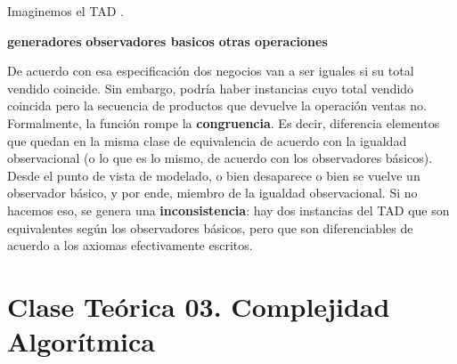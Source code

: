 \documentclass[10pt,a4paper]{article}
\begin{document}
Imaginemos el TAD .
\newline
\begin{tad}{}
	\medskip	
        \textbf{generadores}
	\medskip
	\medskip
	\medskip
        \medskip
        \textbf{observadores basicos}
        \medskip
	\medskip
        \medskip
        \textbf{otras operaciones}
        \medskip
{}
	\medskip
\end{tad}
\medskip
\medskip
De acuerdo con esa especificación dos negocios van a ser iguales si su total vendido coincide. Sin embargo, podría haber instancias cuyo total vendido coincida pero la secuencia de productos que devuelve la operación ventas no.
\newline
\newline
Formalmente, la función  rompe la \textbf{congruencia}. Es decir, diferencia elementos que quedan en la misma clase de equivalencia de acuerdo con la igualdad observacional (o lo que es lo mismo, de acuerdo con los observadores básicos).
\newline
\newline
Desde el punto de vista de modelado, o bien desaparece  o bien se vuelve un observador básico, y por ende, miembro de la igualdad observacional.
\newline
\newline
Si no hacemos eso, se genera una \textbf{inconsistencia}: hay dos instancias del TAD  que son equivalentes según los observadores básicos, pero que son diferenciables de acuerdo a los axiomas efectivamente escritos. 
\newpage

\section{Clase Teórica 03. Complejidad Algorítmica}
\end{document}
